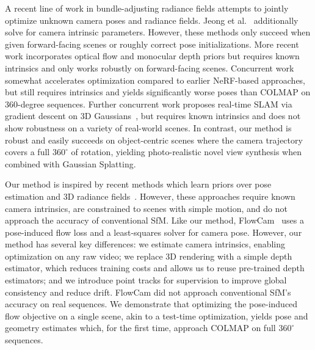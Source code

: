 A recent line of work in bundle-adjusting radiance fields \cite{lin2021barf,bian2022nopenerf,yugay2023gaussian,keetha2023splatam,jeong2021self,fu2023cbarf,wu2023scanerf,fu2023colmapfree,yen2021inerf,xia2022sinerf,wang2021nerf,chng2022garf,cheng2023lu} attempts to jointly optimize unknown camera poses and radiance fields.
Jeong et al.~\cite{jeong2021self} additionally solve for camera intrinsic parameters.
However, these methods only succeed when given forward-facing scenes or roughly correct pose initializations.
More recent work incorporates optical flow and monocular depth priors \cite{bian2022nopenerf,meuleman2023localrf,liu2023robust} but requires known intrinsics and only works robustly on forward-facing scenes.
Concurrent work \cite{fu2023colmapfree} somewhat accelerates optimization compared to earlier NeRF-based approaches, but still requires intrinsics and yields significantly worse poses than COLMAP on 360-degree sequences.
Further concurrent work proposes real-time SLAM via gradient descent on 3D Gaussians~\cite{Matsuki:Murai:etal:CVPR2024}, but requires known intrinsics and does not show robustness on a variety of real-world scenes.
In contrast, our method is robust and easily succeeds on object-centric scenes where the camera trajectory covers a full $360^{\circ}$ of rotation, yielding photo-realistic novel view synthesis when combined with Gaussian Splatting.

Our method is inspired by recent methods which learn priors over pose estimation and 3D radiance fields~\cite{Chen_2023_CVPR, lai2021video, smith2023flowcam, fu2022mononerf}. 
However, these approaches require known camera intrinsics, are constrained to scenes with simple motion, and do not approach the accuracy of conventional SfM. 
Like our method, FlowCam~\cite{smith2023flowcam} uses a pose-induced flow loss and a least-squares solver for camera pose.
However, our method has several key differences: we estimate camera intrinsics, enabling optimization on any raw video; we replace 3D rendering with a simple depth estimator, which reduces training costs and allows us to reuse pre-trained depth estimators; and we introduce point tracks for supervision to improve global consistency and reduce drift.
FlowCam did not approach conventional SfM's accuracy on real sequences.
We demonstrate that optimizing the pose-induced flow objective on a single scene, akin to a test-time optimization, yields pose and geometry estimates which, for the first time, approach COLMAP on full $360^\circ$ sequences.

